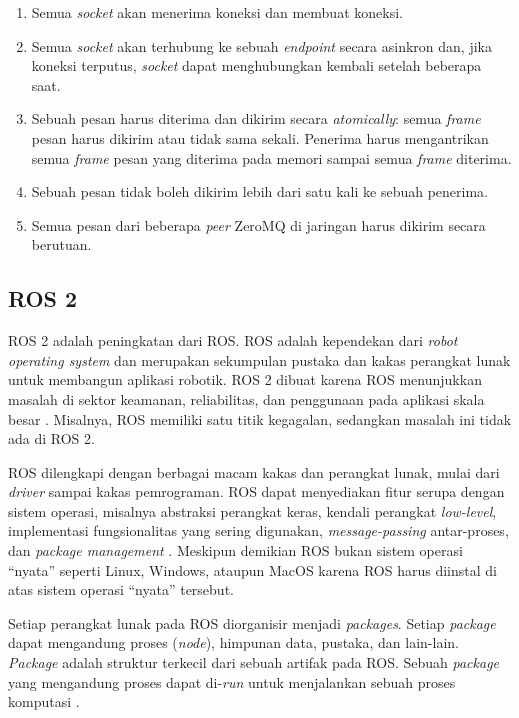 \begin{enumerate}
	\item Semua \textit{socket} akan menerima koneksi dan membuat koneksi.
	\item Semua \textit{socket} akan terhubung ke sebuah \textit{endpoint}
	      secara asinkron dan, jika koneksi terputus, \textit{socket} dapat
	      menghubungkan kembali setelah beberapa saat.
	\item Sebuah pesan harus diterima dan dikirim secara \textit{atomically}:
	      semua \textit{frame} pesan harus dikirim atau tidak sama sekali. Penerima
	      harus mengantrikan semua \textit{frame} pesan yang diterima pada memori
	      sampai semua \textit{frame} diterima.
	\item Sebuah pesan tidak boleh dikirim lebih dari satu kali ke sebuah
	      penerima.
	\item Semua pesan dari beberapa \textit{peer} ZeroMQ di jaringan harus
	      dikirim secara berutuan.
\end{enumerate}

\subsection{ROS 2}\label{chapter-2-section-ros2}

ROS 2 adalah peningkatan dari ROS. ROS adalah kependekan dari \textit{robot
	operating system} dan merupakan sekumpulan pustaka dan kakas perangkat lunak
untuk membangun aplikasi robotik. ROS 2 dibuat karena ROS menunjukkan masalah di
sektor keamanan, reliabilitas, dan penggunaan pada aplikasi skala besar
\parencite{doi:10.1126/scirobotics.abm6074_ros}. Misalnya, ROS memiliki satu
titik kegagalan, sedangkan masalah ini tidak ada di ROS 2.

ROS dilengkapi dengan berbagai macam kakas dan perangkat lunak, mulai dari
\textit{driver} sampai kakas pemrograman. ROS dapat menyediakan fitur serupa
dengan sistem operasi, misalnya abstraksi perangkat keras, kendali perangkat
\textit{low-level}, implementasi fungsionalitas yang sering digunakan,
\textit{message-passing} antar-proses, dan \textit{package management}
\parencite{x_rosIntro}.  Meskipun demikian ROS bukan sistem operasi ``nyata''
seperti Linux, Windows, ataupun MacOS karena ROS harus diinstal di atas sistem
operasi ``nyata'' tersebut.

Setiap perangkat lunak pada ROS diorganisir menjadi \textit{packages}. Setiap
\textit{package} dapat mengandung proses (\textit{node}), himpunan data,
pustaka, dan lain-lain. \textit{Package} adalah struktur terkecil dari sebuah
artifak pada ROS. Sebuah \textit{package} yang mengandung proses dapat
di-\textit{run} untuk menjalankan sebuah proses komputasi
\parencite{x_rosConcepts}.

